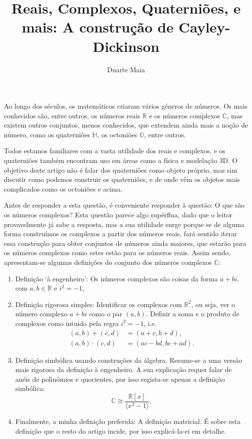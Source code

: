 \documentclass{article}
\title{Reais, Complexos, Quaterniões, e mais: A construção de Cayley-Dickinson}
\author{Duarte Maia}
\newcommand{\R}{\mathbb{R}}
\newcommand{\C}{\mathbb{C}}
\renewcommand{\H}{\mathbb{H}}
\renewcommand{\O}{\mathbb{O}}
\begin{document}
\maketitle

Ao longo dos séculos, os matemáticos criaram vários géneros de números. Os mais conhecidos são, entre outros, os números reais $\R$ e os números complexos $\C$, mas existem outros conjuntos, menos conhecidos, que extendem ainda mais a noção de número, como os quaterniões $\H$, os octoniões $\O$, entre outros.

Todos estamos familiares com a vasta utilidade dos reais e complexos, e os quaterniões também encontram uso em áreas como a física e modelação 3D. O objetivo deste artigo não é falar dos quaterniões como objeto próprio, mas sim discutir como podemos construir os quaterniões, e de onde vêm os objetos mais complicados como os octoniões e acima.

Antes de responder a esta questão, é conveniente responder à questão: O que são os números complexos? Esta questão parece algo supérflua, dado que o leitor provavelmente já sabe a resposta, mas a sua utilidade surge porque se de alguma forma construímos os complexos a partir dos números reais, fará sentido iterar essa construção para obter conjuntos de números ainda maiores, que estarão para os números complexos como estes estão para os números reais. Assim sendo, apresentam-se algumas definições do conjunto dos números complexos $\C$:
\begin{enumerate}[label=\roman*)]
\item Definição `à engenheiro': Os números complexos são coisas da forma $a+bi$, com $a, b \in \R$ e $i^2 = -1$,
\item Definição rigorosa simples: Identificar os complexos com $\R^2$, ou seja, ver o número complexo $a+bi$ como o par $(a,b)$. Definir a soma e o produto de complexos como intuido pela regra $i^2 = -1$, i.e.
\begin{align*}
(a,b)+(c,d) &= (a+c,b+d),\\
(a,b) \cdot (c,d) &= (ac-bd, bc+ad).
\end{align*}
\item Definição simbólica usando construções da álgebra. Resume-se a uma versão mais rigorosa da definição à engenheiro. A sua explicação requer falar de anéis de polinómios e quocientes, por isso regista-se apenas a definição simbólica:
\[\C \cong \frac{\R[x]}{\langle x^2 - 1 \rangle},\]
\item Finalmente, a minha definição preferida: A definição matricial. É sobre esta definição que o resto do artigo incide, por isso explicá-la-ei em detalhe.
\end{enumerate}
\end{document}
